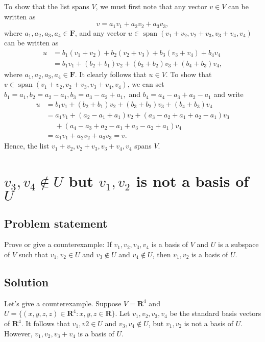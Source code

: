 \documentclass{article}
\begin{document}
To show that the list spans $V$, we must first note that any vector $v\in V$ can be written as
\[v=a_1v_1+a_2v_2+a_3v_3,\]
where $a_1,a_2,a_3,a_4\in\mathbf{F}$, and any vector $u\in\operatorname{span}(v_1+v_2,v_2+v_3,v_3+v_4,v_4)$ can be written as
\begin{align*}
    u&=b_1(v_1+v_2)+b_2(v_2+v_3)+b_3(v_3+v_4)+b_4v_4\\
    &=b_1v_1+(b_2+b_1)v_2+(b_3+b_2)v_3+(b_4+b_3)v_4,
\end{align*}
where $a_1,a_2,a_3,a_4\in\mathbf{F}$.
It clearly follows that $u\in V$. 
To show that\newline $v\in\operatorname{span}(v_1+v_2,v_2+v_3,v_3+v_4,v_4)$, we can set $b_1=a_1,b_2=a_2-a_1,b_3=a_3-a_2+a_1,$ and $b_4=a_4-a_3+a_2-a_1$ and write
\begin{align*}
    u&=b_1v_1+(b_2+b_1)v_2+(b_3+b_2)v_3+(b_4+b_3)v_4\\
    &=a_1v_1+(a_2-a_1+a_1)v_2+(a_3-a_2+a_1+a_2-a_1)v_3\\
    &\;\;\;\;\,+(a_4-a_3+a_2-a_1+a_3-a_2+a_1)v_4\\
    &=a_1v_1+a_2v_2+a_3v_3=v.
\end{align*}
Hence, the list $v_1+v_2,v_2+v_3,v_3+v_4,v_4$ spans $V$.

\clearpage

\renewcommand{\thesection}{7}
\section{$v_3,v_4\notin U$ but $v_1,v_2$ is not a basis of $U$}
\subsection*{Problem statement}
Prove or give a counterexample: 
If $v_1,v_2,v_3,v_4$ is a basis of $V$ and $U$ is a subspace of $V$ such that $v_1,v_2\in U$ and $v_3\notin U$ and $v_4\notin U$, then $v_1,v_2$ is a basis of $U$.

\subsection*{Solution}
Let's give a counterexample. 
Suppose $V=\mathbf{R}^4$ and $U=\{(x,y,z,z)\in\mathbf{R}^4:x,y,z\in\mathbf{R}\}$. 
Let $v_1,v_2,v_3,v_4$ be the standard basis vectors of $\mathbf{R}^4$. 
It follows that $v_1,v2\in U$ and $v_3,v_4\notin U$, but $v_1,v_2$ is not a basis of $U$. 
However, $v_1,v_2,v_3+v_4$ is a basis of $U$.
\end{document}
